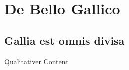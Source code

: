 \section{De Bello Gallico}\raggedbottom 

\subsection{Gallia est omnis divisa} Qualitativer Content 